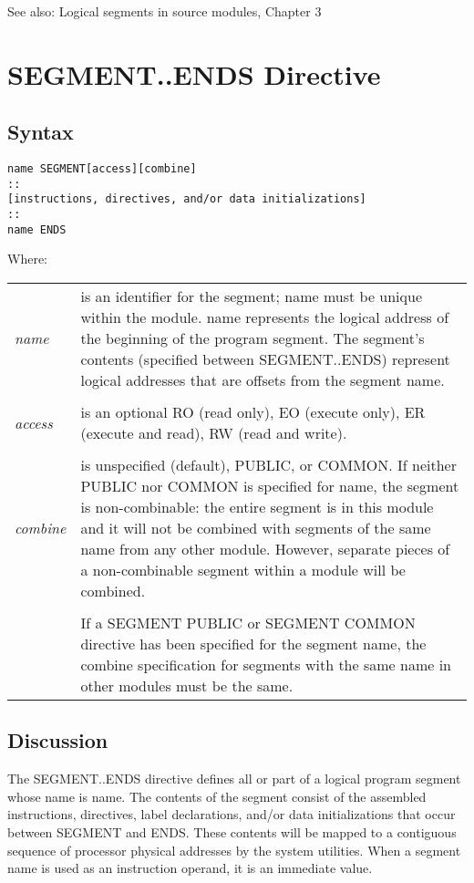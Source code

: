 See also: Logical segments in source modules, Chapter 3

\section*{SEGMENT..ENDS Directive}

\subsection*{Syntax}
\begin{verbatim}
name SEGMENT[access][combine] 
::
[instructions, directives, and/or data initializations] 
::
name ENDS
\end{verbatim}

Where:

\begin{tabular}{p{1.5cm} p{12.9cm}}
\emph{name} & is an identifier for the segment; name must be unique within the module. name represents the logical address of the beginning of the program segment. The segment's contents (specified between SEGMENT..ENDS) represent logical addresses that are offsets from the segment name.\\
\\
\emph{access} & is an optional RO (read only), EO (execute only), ER (execute and read), RW (read and write).\\
\\
\emph{combine} & is unspecified (default), PUBLIC, or COMMON. If neither PUBLIC nor COMMON is specified for name, the segment is non-combinable: the entire segment is in this module and it will not be combined with segments of the same name from any other module. However, separate pieces of a non-combinable segment within a module will be combined.\\
\\
& If a SEGMENT PUBLIC or SEGMENT COMMON directive has been specified for the segment name, the combine specification for segments with the same name in other modules must be the same.\\
\end{tabular}

\subsection*{Discussion}
The SEGMENT..ENDS directive defines all or part of a logical program segment whose name is name. The contents of the segment consist of the assembled instructions, directives, label declarations, and/or data initializations that occur between SEGMENT and ENDS. These contents will be mapped to a contiguous sequence of processor physical addresses by the system utilities. When a segment name is used as an instruction operand, it is an immediate value.

